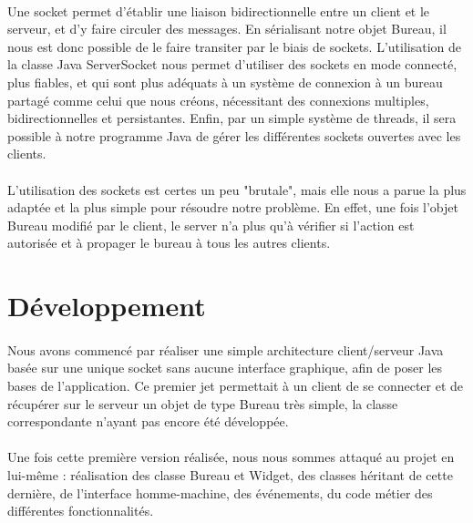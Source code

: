 \paragraph{}
Une socket permet d'établir une liaison bidirectionnelle entre un client et le serveur, et d'y faire circuler des messages. En sérialisant notre objet Bureau, il nous est donc possible de le faire transiter par le biais de sockets. L'utilisation de la classe Java ServerSocket nous permet d'utiliser des sockets en mode connecté, plus fiables, et qui sont plus adéquats à un système de connexion à un bureau partagé comme celui que nous créons, nécessitant des connexions multiples, bidirectionnelles et persistantes. Enfin, par un simple système de threads, il sera possible à notre programme Java de gérer les différentes sockets ouvertes avec les clients.

\paragraph{}
L'utilisation des sockets est certes un peu "brutale", mais elle nous a parue la plus adaptée et la plus simple pour résoudre notre problème. En effet, une fois l'objet Bureau modifié par le client, le server n'a plus qu'à vérifier si l'action est autorisée et à propager le bureau à tous les autres clients.

\section{Développement}

\paragraph{}
Nous avons commencé par réaliser une simple architecture client/serveur Java basée sur une unique socket sans aucune interface graphique, afin de poser les bases de l'application. Ce premier jet permettait à un client de se connecter et de récupérer sur le serveur un objet de type Bureau très simple, la classe correspondante n'ayant pas encore été développée.

\paragraph{}
Une fois cette première version réalisée, nous nous sommes attaqué au projet en lui-même : réalisation des classe Bureau et Widget, des classes héritant de cette dernière, de l'interface homme-machine, des événements, du code métier des différentes fonctionnalités.


